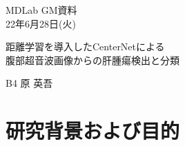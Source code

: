\documentclass[a4j]{ujarticle}
\begin{document}
    \begin{flushright}
        MDLab GM資料\\
        22年6月28日(火)
    \end{flushright}

    \begin{center}
        {\Large	距離学習を導入したCenterNetによる\\腹部超音波画像からの肝腫瘍検出と分類}
    \end{center}

    \begin{flushright}
        {\large B4 原 英吾}\\
    \end{flushright}

    \section{研究背景および目的}
\end{document}
